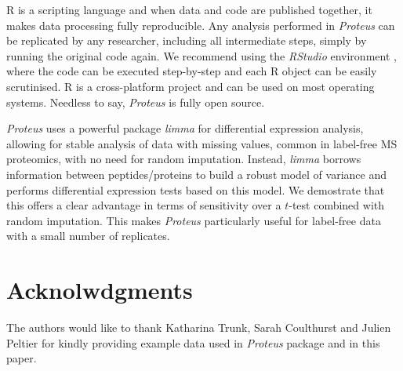 \documentclass[]{article}
\begin{document}
R is a scripting language and when data and code are published together,
it makes data processing fully reproducible. Any analysis performed in
\emph{Proteus} can be replicated by any researcher, including all
intermediate steps, simply by running the original code again. We
recommend using the \emph{RStudio} environment \citep{rstudio}, where
the code can be executed step-by-step and each R object can be easily
scrutinised. R is a cross-platform project and can be used on most
operating systems. Needless to say, \emph{Proteus} is fully open source.

\emph{Proteus} uses a powerful package \emph{limma} for differential
expression analysis, allowing for stable analysis of data with missing
values, common in label-free MS proteomics, with no need for random
imputation. Instead, \emph{limma} borrows information between
peptides/proteins to build a robust model of variance and performs
differential expression tests based on this model. We demostrate that
this offers a clear advantage in terms of sensitivity over a \(t\)-test
combined with random imputation. This makes \emph{Proteus} particularly
useful for label-free data with a small number of replicates.

\section{Acknolwdgments}\label{acknolwdgments}

The authors would like to thank Katharina Trunk, Sarah Coulthurst and
Julien Peltier for kindly providing example data used in \emph{Proteus}
package and in this paper.

\renewcommand\refname{References}

\end{document}
